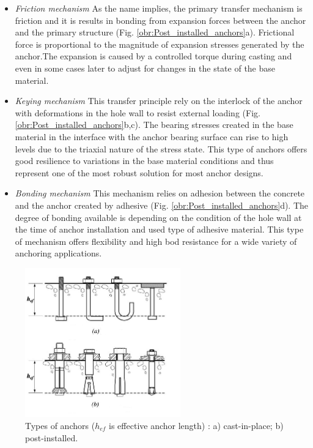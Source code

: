 \begin{itemize}
	\item \textit{Friction mechanism}
	As the name implies, the primary transfer mechanism is friction and it is results in bonding from expansion forces between the anchor and the primary structure (Fig. \ref{obr:Post_installed_anchors}a). Frictional force is proportional to the magnitude of expansion stresses generated by the anchor.The expansion is caused by a controlled torque during casting and even in some cases later to adjust for changes in the state of the base material.
	
	\item \textit{Keying mechanism}
	This transfer principle rely on the interlock of the anchor with deformations in the hole wall to resist external loading (Fig. \ref{obr:Post_installed_anchors}b,c). The bearing stresses created in the base material in the interface with the anchor bearing surface can rise to high levels due to the triaxial nature of the stress state. This type of anchors offers good resilience to variations in the base material conditions and thus represent one of the most robust solution for most anchor designs. 
	
	\item \textit{Bonding mechanism}
	This mechanism relies on adhesion between the concrete and the anchor created by adhesive (Fig. \ref{obr:Post_installed_anchors}d). The degree of bonding available is depending on the condition of the hole wall at the time of anchor installation and used type of adhesive material. This type of mechanism offers flexibility and high bod resistance for a wide variety of anchoring applications. 
\end{itemize}


\begin{figure}[h!]
	\centering
	\includegraphics[width=0.6\textwidth]{obrazky/anchor_types_repaired.png}
	\caption[Types of anchors]{Types of anchors ($h_{ef}$ is effective anchor length) \cite{anchors-ACI-318M}: a) cast-in-place; b) post-installed.}\label{obr:Anchors}
\end{figure}


